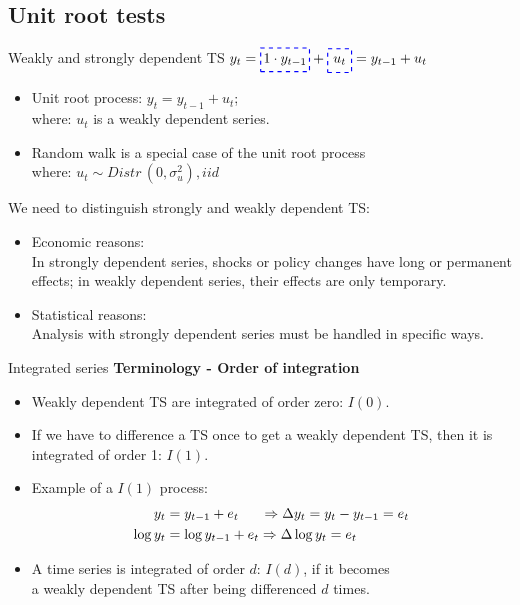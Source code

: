 \documentclass{beamer}
\newcommand*\boxedd[1]{\tikz[baseline=(char.base)]{
    \node[shape=rectangle, dashed, draw=blue, thick, inner sep=2pt, minimum size=0.6cm] (char) {#1};}}
\begin{document}
\subsection{Unit root tests}
\begin{frame}{Weakly and strongly dependent TS}
$y_t = \boxedd{$1 \cdot y_{t-1}$} + \boxedd{$u_t$} = y_{t-1} + u_t$
\medskip
\begin{itemize}
\item Unit root process: $y_t = y_{t-1} + u_t$; \quad  \\
where: $u_t$ is a weakly dependent series.
\item Random walk is a special case of the unit root process \\where: $u_t \sim \textit{Distr} \, (0, \sigma_u^2), \textit{iid}$
\bigskip
\end{itemize}
We need to distinguish strongly and weakly dependent TS:
\begin{itemize}
\item Economic reasons: \\ In strongly dependent series, shocks or policy changes  have  long or permanent effects; in weakly dependent series, their effects  are only temporary.
\item Statistical reasons: \\ Analysis with strongly dependent series must be handled in specific ways.
\end{itemize}
\end{frame}
\begin{frame}{Integrated series}
\textbf{Terminology - Order of integration }
\vspace{0.5cm}
\begin{itemize}
\item Weakly dependent TS are integrated of order zero: $I(0)$.
\vspace{0.2cm}
\item If we have to difference a TS once to get a weakly dependent TS, then it is integrated of order 1: $I(1)$.
\vspace{0.2cm}
\item Example of a $I(1)$ process:
\begin{align}\nonumber
y_t & =y_{t-1}+e_t  \hspace{0.55cm} \Rightarrow \Delta y_t = y_t-y_{t-1}=e_t \\\nonumber
 \log{y_t} & =\log{y_{t-1}}+e_t  \Rightarrow \Delta \log{y_t}=e_t
 \end{align} 
 \item A time series is integrated of order $d$: $I(d)$, if it becomes \\a weakly dependent TS after being differenced $d$ times.
\end{itemize}
\end{frame}
\end{document}
